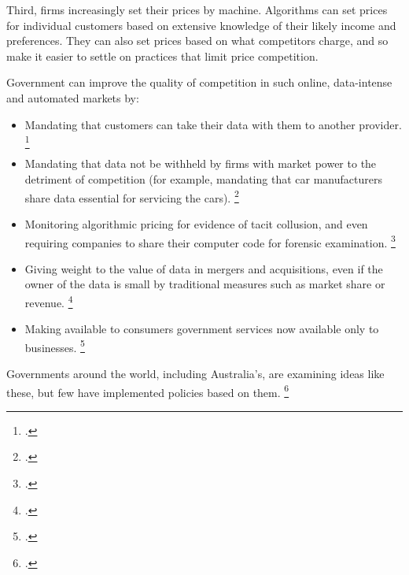Third, firms increasingly set their prices by machine. Algorithms can set prices for individual customers based on extensive knowledge of their likely income and preferences. They can also set prices based on what competitors charge, and so make it easier to settle on practices that limit price competition. 

Government can improve the quality of competition in such online, data-intense and automated markets by: 
\begin{itemize}
\item Mandating that customers can take their data with them to another provider.%
    \footcites{Gruen_portable_2014}{Zingales_portability_2017}{Harford_Facebook_2017}
\item Mandating that data not be withheld by firms with market power to the detriment of competition (for example, mandating that car manufacturers share data essential for servicing the cars).%
    \footcites{Newyorker_algo_2015}{EzrachiVirtual}{EconPricebots2017}
\item Monitoring algorithmic pricing for evidence of tacit collusion, and even requiring companies to share their computer code for forensic examination.%
    \footcites{ACCCNewCarMarketStudyDraft2017}
\item Giving weight to the value of data in mergers and acquisitions, even if the owner of the data is small by traditional measures such as market share or revenue.%
    \footcite{EconData2017}
\item Making available to consumers government services now available only to businesses.%
    \footcites{EconData2017}{Gruen_centralbanking_2014}
\end{itemize}

Governments around the world, including Australia's, are examining ideas like these, but few have implemented policies based on them.%
    \footcites{PC-data-2017}{FT_Japan_competition_2017}{OECD-Algorithm-2017}




